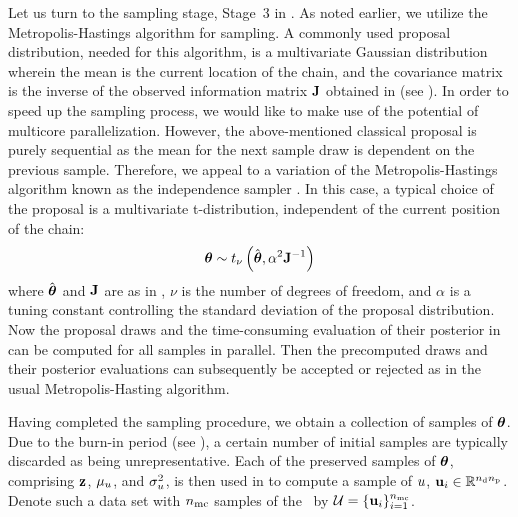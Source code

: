 Let us turn to the sampling stage, Stage~3 in . As noted earlier, we utilize the Metropolis-Hastings algorithm for sampling.
A commonly used proposal distribution, needed for this algorithm, is a multivariate Gaussian distribution wherein the mean is the current location of the chain, and the covariance matrix is the inverse of the observed information matrix $\mathbf{J}$ obtained in  (see \cite{gelman2004, bernardo2007}).
In order to speed up the sampling process, we would like to make use of the potential of multicore parallelization. However, the above-mentioned classical proposal is purely sequential as the mean for the next sample draw is dependent on the previous sample. Therefore, we appeal to a variation of the Metropolis-Hastings algorithm known as the independence sampler \cite{gelman2004}. In this case, a typical choice of the proposal is a multivariate t-distribution, independent of the current position of the chain:
\begin{equation} \elabel{proposal}
  \vparam \sim \studentst{\nu}{\hat{\vparam}}{\alpha^2 \mOI^{-1}}
\end{equation}
where $\hat{{\boldsymbol\theta}}$ and $\mathbf{J}$ are as in , $\nu$ is the number of degrees of freedom, and $\alpha$ is a tuning constant controlling the standard deviation of the proposal distribution.
Now the proposal draws and the time-consuming evaluation of their posterior in  can be computed for all samples in parallel.
Then the precomputed draws and their posterior evaluations can subsequently be accepted or rejected as in the usual Metropolis-Hasting algorithm.

Having completed the sampling procedure, we obtain a collection of samples of ${\boldsymbol\theta}$. Due to the burn-in period (see ), a certain number of initial samples are typically discarded as being unrepresentative.
Each of the preserved samples of ${\boldsymbol\theta}$, comprising $\mathbf{z}$, $\mu_u$, and $\sigma^2_u$, is then used in  to compute a sample of $u$, $\mathbf{u}_i \in \mathbb{R}^{{n_\text{d}} {n_\text{p}}}$.
Denote such a data set with ${n_\text{mc}}$ samples of the \qoi\ by $\mathcal{U} = \{ \mathbf{u}_i \}_{i = 1}^{n_\text{mc}}$.
